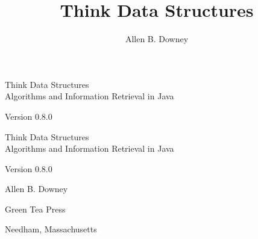 \documentclass[12pt]{book}
\title{Think Data Structures}
\author{Allen B. Downey}
\newcommand{\thetitle}{Think Data Structures}
\newcommand{\thesubtitle}{Algorithms and Information Retrieval in Java}
\newcommand{\theauthors}{Allen B. Downey}
\newcommand{\theversion}{0.8.0}
\theoremstyle{exercise}
\newif\ifplastex
\begin{document}
\frontmatter

\ifplastex

\maketitle

\else

\begin{latexonly}

\thispagestyle{empty}

\begin{flushright}
\vspace*{2.0in}

\begin{spacing}{3}
{\huge \thetitle} \\
{\Large \thesubtitle}
\end{spacing}

\vspace{0.25in}

Version \theversion

\vfill
\end{flushright}

\newpage
\thispagestyle{empty}

\quad

\newpage
\thispagestyle{empty}

\begin{flushright}
\vspace*{2.0in}

\begin{spacing}{3}
{\huge \thetitle} \\
{\Large \thesubtitle}
\end{spacing}

\vspace{0.25in}

Version \theversion

\vspace{1in}

{\Large \theauthors}

\vspace{0.5in}

{\Large Green Tea Press}

{\small Needham, Massachusetts}

\vfill
\end{flushright}


\end{latexonly}
\end{document}
